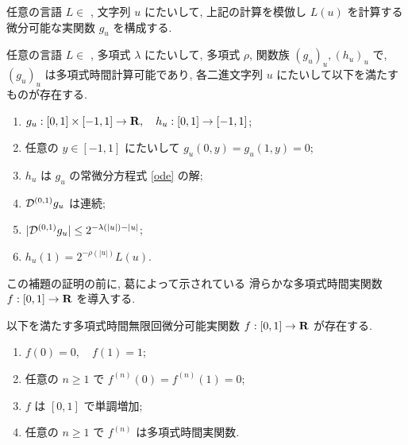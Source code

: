 任意の言語 $L \in $ \PSPACE, 文字列 $u$ にたいして,
上記の計算を模倣し $L(u)$ を計算する微分可能な実関数 $g_u$ を構成する.

\begin{lemma}
 \label{DifferentiableFamily}
 任意の言語 $L \in $ \PSPACE, 多項式 $\lambda$ にたいして,
 多項式 $\rho$, 関数族 $(g_u)_u, (h_u)_u$ で, 
 $(g_u)_u$ は多項式時間計算可能であり,
 各二進文字列 $u$ にたいして以下を満たすものが存在する.
 \begin{enumerate}
  \item $g_u:[0,1] \times [-1,1]\to \mathbf R, \quad h_u: [0,1] \to [-1,1]$;
  \item 任意の $y \in [-1,1]$ にたいして $g_u(0,y) = g_u(1,y) = 0 $; 
  \item $h_u$ は $g_u$ の常微分方程式 \ref{ode} の解; 
  \item $\mathcal D^{(0,1)} g_u$ は連続;
  \item $|\mathcal D^{(0,1)} g_u| \leq 2^{-\lambda(|u|) - |u| } $;
  \item $h_u(1) = 2^{-\rho(|u|)}L(u)$.
 \end{enumerate}
\end{lemma}

 この補題の証明の前に, 葛によって示されている
 滑らかな多項式時間実関数 $f : [0,1] \to \mathbf R$ を導入する.
 
 \begin{lemma}
  \label{SmoothFunction}
  以下を満たす多項式時間無限回微分可能実関数 $f : [0,1] \to \mathbf R$ が存在する.
  \begin{enumerate}
   \item $f(0) = 0, \quad f(1) = 1$;
   \item 任意の $n \ge 1$ で $f^{(n)}(0) = f^{(n)}(1) = 0$;
   \item $f$ は $[0,1]$ で単調増加;
   \item 任意の $n \ge 1$ で $f^{(n)}$ は多項式時間実関数.
  \end{enumerate}
 \end{lemma} 

